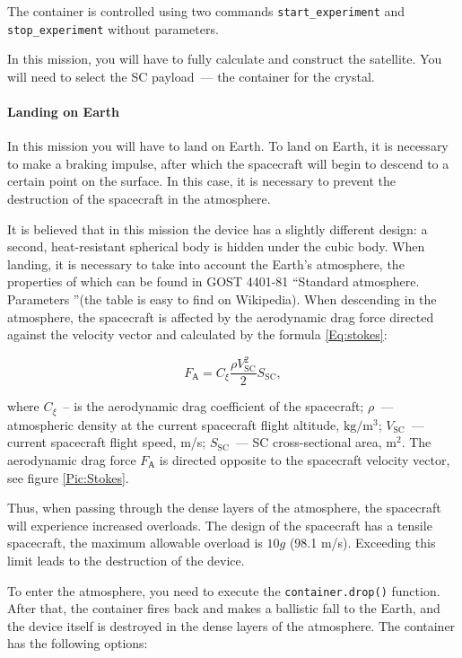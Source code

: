 \documentclass[12pt,a4paper]{article}
\begin{document}
The container is controlled using two commands \verb'start_experiment' and \verb'stop_experiment' without parameters.

In this mission, you will have to fully calculate and construct the satellite. You will need to select the SC payload~--- the container for the crystal.

\paragraph{Landing on Earth}

In this mission you will have to land on Earth. To land on Earth, it is necessary to make a braking impulse, after which the spacecraft will begin to descend to a certain point on the surface. In this case, it is necessary to prevent the destruction of the spacecraft in the atmosphere.

It is believed that in this mission the device has a slightly different design: a second, heat-resistant spherical body is hidden under the cubic body. When landing, it is necessary to take into account the Earth's atmosphere, the properties of which can be found in GOST 4401-81 “Standard atmosphere. Parameters ”(the table is easy to find on Wikipedia). When descending in the atmosphere, the spacecraft is affected by the aerodynamic drag force directed against the velocity vector and calculated by the formula \ref{Eq:stokes}:

$$
  F_{\text{А}} = C_\xi \frac{\rho V_{\text{SC}}^2}{2} S_{\text{SC}},
  $$

where $C_\xi$~-- is the aerodynamic drag coefficient of the spacecraft; $\rho$~--– atmospheric density at the current spacecraft flight altitude, $\text{kg}/\text{m}^3$; $V_{\text{SC}}$~--– current
spacecraft flight speed, m/s; $S_{\text{SC}}$~--- SC cross-sectional area, $\text{m}^2$. The aerodynamic drag force $F_{\text{А}}$ is directed opposite to the spacecraft velocity vector, see figure \ref{Pic:Stokes}.

Thus, when passing through the dense layers of the atmosphere, the spacecraft will experience increased overloads. The design of the spacecraft has a tensile spacecraft, the maximum allowable overload is $10g$ (98.1 m/s). Exceeding this limit leads to the destruction of the device.

To enter the atmosphere, you need to execute the \verb'container.drop()' function. After that, the container fires back and makes a ballistic fall to the Earth, and the device itself is destroyed in the dense layers of the atmosphere. The container has the following options:
\end{document}
